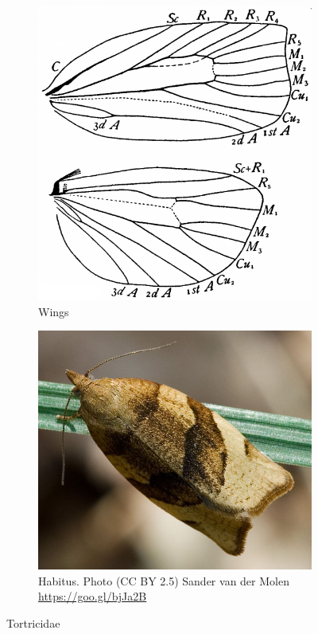 \documentclass[letterpaper, 11pt]{article}
\begin{document}
\begin{figure}[ht!]
    \centering
    \begin{subfigure}[ht!]{0.35\textwidth}
        \includegraphics[width=\textwidth]{TortricidWings}
        \caption{Wings \citep[Fig. 353]{comstock1918wings}}
        \label{fig:tortricid1}
    \end{subfigure}
    \qquad
    \begin{subfigure}[ht!]{0.40\textwidth}
        \includegraphics[width=\textwidth]{TortricidHabitus}
        \caption{Habitus. Photo (CC BY 2.5) Sander van der Molen \url{https://goo.gl/bjJa2B}}
        \label{fig:tortricid2}
    \end{subfigure}
    \caption{Tortricidae}\label{fig:tortricids}
\end{figure}
\end{document}
